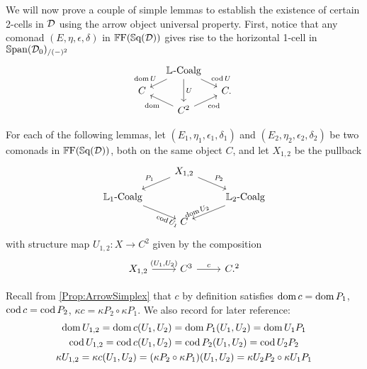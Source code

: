 We will now prove a couple of simple lemmas to establish the existence of certain 2-cells in $\mathcal{D}$ using the arrow object universal property. First, notice that any comonad $(E,\eta,\epsilon,\delta)$ in $\mathbb{F}\mathrm{F}(\mathbb{S}\mathrm{q}(\mathcal{D}))$ gives rise to the horizontal 1-cell in $\mathbb{S}\mathrm{pan}(\mathcal{D}_0)_{/(-)^2}$
\[
\begin{tikzcd}[row sep=tiny,column sep=small]
	{} & \LCoalg \dlar[swap]{\dom U} \drar{\cod U} \ar{dd}{U} & \\
	C && C. \\
	& C^2 \ular{\dom} \urar[swap]{\cod}
\end{tikzcd}
\]

For each of the following lemmas, let $(E_1,\eta_1,\epsilon_1,\delta_1)$ and $(E_2,\eta_2,\epsilon_2,\delta_2)$ be two comonads in $\mathbb{F}\mathrm{F}(\mathbb{S}\mathrm{q}(\mathcal{D}))$, both on the same object $C$, and let $X_{1,2}$ be the pullback
\[
\begin{tikzcd}[row sep=small]
	{} & X_{1,2} \dlar[swap]{P_1} \drar{P_2}
	& \\
	\LCoalg[1] \drar[sloped,pos=.8,swap]{\cod U_1}
		&& \LCoalg[2] \dlar[sloped,pos=.8]{\dom U_2} \\
	& C &
\end{tikzcd}
\]
with structure map $U_{1,2}\colon X\to C^2$ given by the composition
\[
\begin{tikzcd}
	X_{1,2} \rar{(U_1,U_2)} & C^3 \rar{c} & C.^2
\end{tikzcd}
\]

Recall from \cref{Prop:ArrowSimplex} that $c$ by definition satisfies $\operatorname{dom} c=\operatorname{dom} P_1$, $\operatorname{cod} c=\operatorname{cod} P_2$, $\kappa c=\kappa P_2\circ\kappa P_1$.
We also record for later reference:
\begin{gather}
	\operatorname{dom} U_{1,2} = \operatorname{dom} c(U_1,U_2) = \operatorname{dom} P_1(U_1,U_2) = \operatorname{dom} U_1P_1
	\label{Eq:domU12} \\
	\operatorname{cod} U_{1,2} = \operatorname{cod} c(U_1,U_2) = \operatorname{cod} P_2(U_1,U_2) = \operatorname{cod} U_2P_2 
	\label{Eq:codU12} \\
	\kappa U_{1,2} = \kappa c(U_1,U_2) = (\kappa P_2\circ\kappa P_1)(U_1,U_2) = \kappa U_2P_2\circ\kappa U_1P_1
	\label{Eq:kappaU12}
\end{gather}


